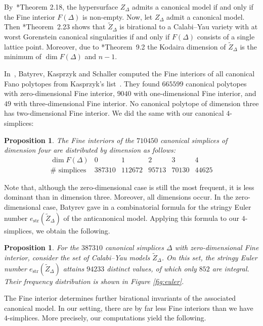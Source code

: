 \documentclass{amsart}
\theoremstyle{plain}
\newtheorem{proposition}[theorem]{Proposition}
\theoremstyle{definition}
\begin{document}
By~\cite{Bat17}*{Theorem 2.18}, the hypersurface $Z_\Delta$ admits a
canonical model if and only if the Fine interior
$F(\Delta)$ is non-empty.
Now, let $Z_\Delta$ admit a canonical model.
Then \cite{Bat17}*{Theorem~2.23} shows that $\widetilde Z_\Delta$
is birational to a Calabi--Yau variety with at worst
Gorenstein canonical singularities if and only if $F(\Delta)$
consists of a single lattice point.
Moreover, due to \cite{Bat23}*{Theorem~9.2} the Kodaira dimension
of $\widetilde Z_\Delta$ is the minimum of $\dim F(\Delta)$ and $n-1$.

In~\cite{BKS}, Batyrev, Kasprzyk and Schaller computed the Fine
interiors of all canonical Fano polytopes from Kasprzyk's list~\cite{Kas3}.
They found $665599$ canonical polytopes with zero-dimensional Fine
interior, $9040$ with one-dimensional Fine interior, and $49$ with
three-dimensional Fine interior. No canonical polytope of dimension
three has two-dimensional Fine interior.
We did the same with our canonical $4$-simplices:

\begin{proposition}
The Fine interiors of the $710450$ canonical simplices
of dimension four are distributed by dimension as follows:
$$
\begin{array}{c|ccccc}
\dim F(\Delta) & 0 & 1 & 2 & 3 & 4\\
\hline
\#\text{ simplices} & 387310 & 112672 & 95713 & 70130 & 44625
\end{array}
$$
\end{proposition}

Note that, although the zero-dimensional case is still the most frequent,
it is less dominant than in dimension three. Moreover, all dimensions occur.
In the zero-dimensional case, Batyrev gave in \cite{Bat17} a combinatorial
formula for the stringy Euler number $e_{\mathrm{str}}(\widetilde Z_\Delta)$
of the anticanonical model.
Applying this formula to our $4$-simplices, we obtain the following.

\begin{proposition}
For the $387310$ canonical simplices $\Delta$ with zero-dimensional
Fine interior, consider the set of Calabi--Yau models $\widetilde Z_\Delta$.
On this set, the stringy Euler number $e_{\mathrm{str}}(\widetilde Z_\Delta)$
attains $94233$ distinct values, of which only $852$ are integral.
Their frequency distribution is shown in Figure \ref{fig:euler}.
\end{proposition}

The Fine interior determines further birational invariants of the associated
canonical model.
In our setting, there are by far less Fine interiors than we have $4$-simplices.
More precisely, our computations yield the following.
\end{document}
